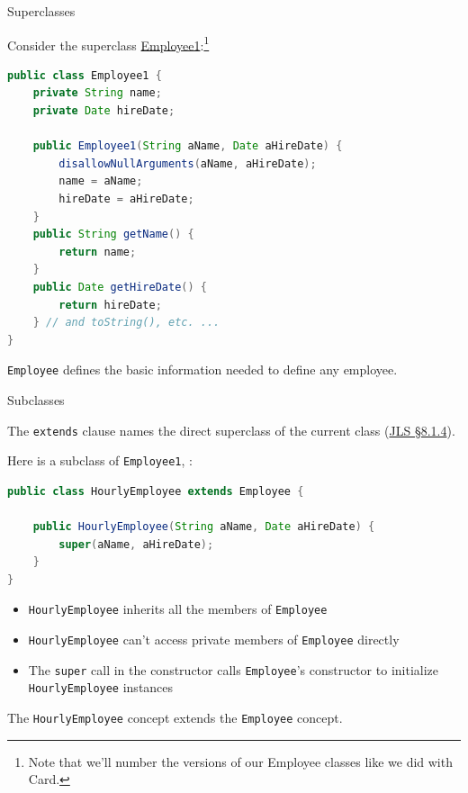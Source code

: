 \documentclass{beamer}
\begin{document}
\begin{frame}[fragile]{Superclasses}

\vspace{-.05in}
Consider the superclass \href{\code/employee/Employee1.java}{Employee1}:\footnote{Note that we'll number the versions of our Employee classes like we did with Card.}
\vspace{-.05in}
\begin{lstlisting}[language=Java]
public class Employee1 {
    private String name;
    private Date hireDate;

    public Employee1(String aName, Date aHireDate) {
        disallowNullArguments(aName, aHireDate);
        name = aName;
        hireDate = aHireDate;
    }
    public String getName() {
        return name;
    }
    public Date getHireDate() {
        return hireDate;
    } // and toString(), etc. ...
}
\end{lstlisting}
\vspace{-.05in}
{\tt Employee} defines the basic information needed to define any employee.

\end{frame}

\begin{frame}[fragile]{Subclasses}


The {\tt extends} clause names the direct superclass of the current class (\href{http://docs.oracle.com/javase/specs/jls/se7/html/jls-8.html#jls-8.1.4)}{JLS \S 8.1.4}).

Here is a subclass of {\tt Employee1},  :
\begin{lstlisting}[language=Java]
public class HourlyEmployee extends Employee {

    public HourlyEmployee(String aName, Date aHireDate) {
        super(aName, aHireDate);
    }
}
\end{lstlisting}

\begin{itemize}
\item {\tt HourlyEmployee} inherits all the members of {\tt Employee}
\item {\tt HourlyEmployee} can't access private members of {\tt Employee} directly
\item The {\tt super} call in the constructor calls {\tt Employee}'s constructor to initialize {\tt HourlyEmployee} instances
\end{itemize}
The {\tt HourlyEmployee} concept extends the {\tt Employee} concept.

\end{frame}
\end{document}
